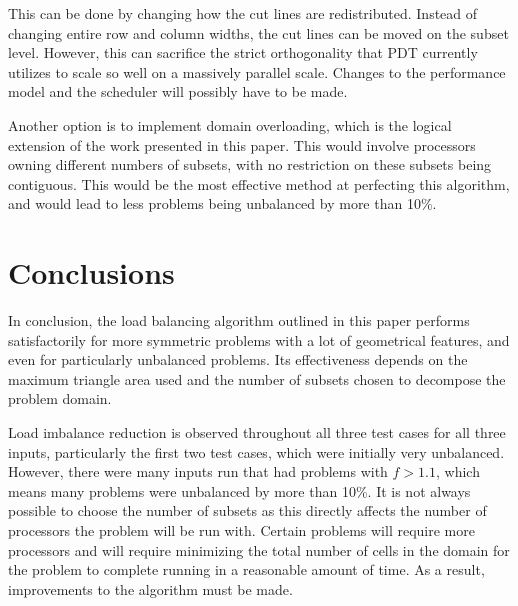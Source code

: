 \documentclass{anstrans}
\begin{document}
This can be done by changing how the cut lines are redistributed. Instead of changing entire row and column widths, the cut lines can be moved on the subset level. However, this can sacrifice the strict orthogonality that PDT currently utilizes to scale so well on a massively parallel scale. Changes to the performance model and the scheduler will possibly have to be made.

Another option is to implement domain overloading, which is the logical extension of the work presented in this paper. This would involve processors owning different numbers of subsets, with no restriction on these subsets being contiguous. This would be the most effective method at perfecting this algorithm, and would lead to less problems being unbalanced by more than 10\%.

\section{Conclusions}

In conclusion, the load balancing algorithm outlined in this paper performs satisfactorily for more symmetric problems with a lot of geometrical features, and even for particularly unbalanced problems. Its effectiveness depends on the maximum triangle area used and the number of subsets chosen to decompose the problem domain. 

Load imbalance reduction is observed throughout all three test cases for all three inputs, particularly the first two test cases, which were initially very unbalanced. However, there were many inputs run that had problems with $f > 1.1$, which means many problems were unbalanced by more than 10\%. It is not always possible to choose the number of subsets as this directly affects the number of processors the problem will be run with. Certain problems will require more processors and will require minimizing the total number of cells in the domain for the problem to complete running in a reasonable amount of time. As a result, improvements to the algorithm must be made. 

\end{document}
